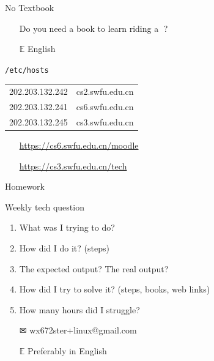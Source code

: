 \begin{frame}{No Textbook}%
  \begin{itemize}
  \item[\nerd{}] Do you need a book to learn riding a\hspace{.5ex} {\nerd }?
  \item[{\GG}]\google
  \item[$\mathbb{E}$] {\purisa English}
  \end{itemize}
  \begin{block}{\texttt{/etc/hosts}}%
    \begin{center}\ttfamily
      \begin{tabular}{ll}
        202.203.132.242&cs2.swfu.edu.cn\\
        202.203.132.241&cs6.swfu.edu.cn\\
        202.203.132.245&cs3.swfu.edu.cn
      \end{tabular}
    \end{center}
    \begin{itemize}
    \item[]\moodle\quad\url{https://cs6.swfu.edu.cn/moodle}
    \item[]{\small\openbook}\quad\url{https://cs3.swfu.edu.cn/tech}
    \end{itemize}
  \end{block}
\end{frame}

\begin{frame}{Homework}
  \begin{block}{Weekly tech question}
    \begin{enumerate}
    \item What was I trying to do?
    \item How did I do it? (steps)
    \item The expected output? The real output?
    \item How did I try to solve it? (steps, books, web links)
    \item How many hours did I struggle?
    \end{enumerate}
  \end{block}
  \begin{itemize}
  \item[\Large\dejavu ✉] \alert{\ttfamily wx672ster+linux@gmail.com}
  \item[$\mathbb{E}$] Preferably in English
  \end{itemize}
\end{frame}


